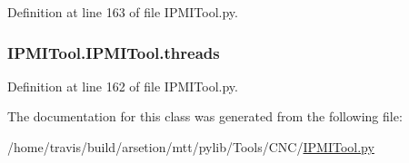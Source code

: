 Definition at line 163 of file I\-P\-M\-I\-Tool.\-py.

\hypertarget{classIPMITool_1_1IPMITool_a2f6ca8b0b509ba2c514b72312841b2d6}{
\subsubsection[{threads}]{\setlength{\rightskip}{0pt plus 5cm}I\-P\-M\-I\-Tool.\-I\-P\-M\-I\-Tool.\-threads}}\label{classIPMITool_1_1IPMITool_a2f6ca8b0b509ba2c514b72312841b2d6}


Definition at line 162 of file I\-P\-M\-I\-Tool.\-py.



The documentation for this class was generated from the following file\-:\begin{DoxyCompactItemize}
\item 
/home/travis/build/arsetion/mtt/pylib/\-Tools/\-C\-N\-C/\hyperlink{IPMITool_8py}{I\-P\-M\-I\-Tool.\-py}\end{DoxyCompactItemize}
